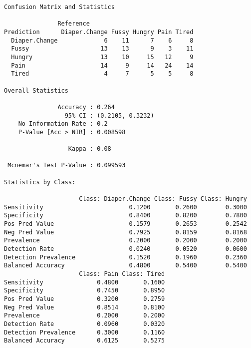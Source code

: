 \documentclass[
  letterpaper,
  DIV=11,
  numbers=noendperiod]{scrartcl}
\newenvironment{Shaded}{\begin{snugshade}}{\end{snugshade}}
\newcommand{\FunctionTok}[1]{\textcolor[rgb]{0.28,0.35,0.67}{#1}}
\newcommand{\NormalTok}[1]{\textcolor[rgb]{0.00,0.23,0.31}{#1}}
\newcommand{\OtherTok}[1]{\textcolor[rgb]{0.00,0.23,0.31}{#1}}
\newcommand{\SpecialCharTok}[1]{\textcolor[rgb]{0.37,0.37,0.37}{#1}}
\newcommand{\StringTok}[1]{\textcolor[rgb]{0.13,0.47,0.30}{#1}}
\begin{document}
\begin{verbatim}
Confusion Matrix and Statistics

               Reference
Prediction      Diaper.Change Fussy Hungry Pain Tired
  Diaper.Change             6    11      7    6     8
  Fussy                    13    13      9    3    11
  Hungry                   13    10     15   12     9
  Pain                     14     9     14   24    14
  Tired                     4     7      5    5     8

Overall Statistics
                                          
               Accuracy : 0.264           
                 95% CI : (0.2105, 0.3232)
    No Information Rate : 0.2             
    P-Value [Acc > NIR] : 0.008598        
                                          
                  Kappa : 0.08            
                                          
 Mcnemar's Test P-Value : 0.099593        

Statistics by Class:

                     Class: Diaper.Change Class: Fussy Class: Hungry
Sensitivity                        0.1200       0.2600        0.3000
Specificity                        0.8400       0.8200        0.7800
Pos Pred Value                     0.1579       0.2653        0.2542
Neg Pred Value                     0.7925       0.8159        0.8168
Prevalence                         0.2000       0.2000        0.2000
Detection Rate                     0.0240       0.0520        0.0600
Detection Prevalence               0.1520       0.1960        0.2360
Balanced Accuracy                  0.4800       0.5400        0.5400
                     Class: Pain Class: Tired
Sensitivity               0.4800       0.1600
Specificity               0.7450       0.8950
Pos Pred Value            0.3200       0.2759
Neg Pred Value            0.8514       0.8100
Prevalence                0.2000       0.2000
Detection Rate            0.0960       0.0320
Detection Prevalence      0.3000       0.1160
Balanced Accuracy         0.6125       0.5275
\end{verbatim}

\begin{Shaded}
\end{Shaded}
\end{document}
